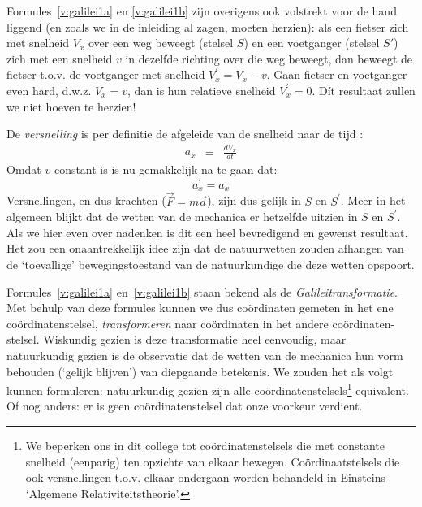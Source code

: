 Formules~\ref{v:galilei1a} en \ref{v:galilei1b} zijn overigens ook
volstrekt voor de hand liggend (en zoals we in de inleiding al zagen, moeten
herzien): als een fietser zich met snelheid $V_{x}$ over een weg
beweegt (stelsel $S$) en een voetganger (stelsel $S{'}$) zich met een
snelheid $v$ in dezelfde richting over die weg beweegt, dan beweegt de
fietser t.o.v. de voetganger met snelheid $V_{x}^{'} = V_{x} -
v$. Gaan fietser en voetganger even hard, d.w.z. $V_{x} = v$, dan is
hun relatieve snelheid $V_{x}^{'} = 0$. D\'{i}t resultaat zullen we
niet hoeven te herzien!

De {\sl versnelling} is per definitie de afgeleide van de snelheid 
naar de tijd :
\begin{eqnarray*}
a_{x} & \equiv & \frac{dV_{x}}{dt}
\end{eqnarray*}
Omdat $v$ constant is is nu gemakkelijk na te gaan dat:
\begin{equation}
\label{v:galilei3}
a_{x}^{'}  = a_{x}
\end{equation}
Versnellingen, en dus krachten ($\vec{F} = m\vec{a}$), zijn dus gelijk
in $S$ en $S^{'}$.  Meer in het algemeen blijkt dat de wetten van de
mechanica er hetzelfde uitzien in $S$ en $S^{'}$.  Als we hier even
over nadenken is dit een heel bevredigend en gewenst resultaat.  Het
zou een onaantrekkelijk idee zijn dat de natuurwetten zouden afhangen
van de `toevallige' bewegingstoestand van de natuurkundige die deze
wetten opspoort.

Formules~\ref{v:galilei1a} en~\ref{v:galilei1b} staan bekend als de
\textit{Galileitransformatie}.  Met behulp van deze formules kunnen we dus
co\"{o}rdinaten gemeten in het ene co\"{o}rdinatenstelsel,
{\sl transformeren} naar co\"{o}rdinaten in het andere
co\"{o}rdinaten-stelsel.  Wiskundig gezien is deze transformatie heel
eenvoudig, maar natuurkundig gezien is de observatie dat de wetten van
de mechanica hun vorm behouden (`gelijk blijven') van diepgaande
betekenis.  We zouden het als volgt kunnen formuleren: natuurkundig
gezien zijn alle co\"{o}rdinatenstelsels\footnote{We beperken ons in
dit college tot co\"{o}rdinatenstelsels die met constante snelheid (eenparig) ten
opzichte van elkaar bewegen. Co\"ordinaatstelsels die ook
versnellingen t.o.v. elkaar ondergaan worden behandeld in Einsteins
`Algemene Relativiteitstheorie'.} equivalent.  Of nog anders: er is geen
co\"{o}rdinatenstelsel dat onze voorkeur verdient.  

